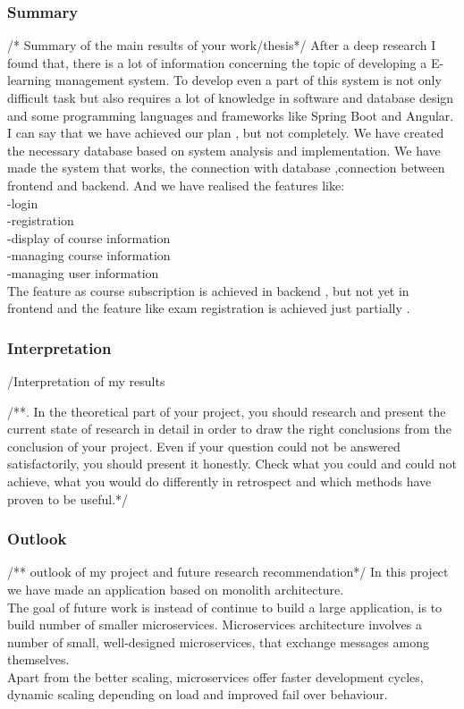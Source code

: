 \documentclass{scrartcl}
\begin{document}
\subsubsection{Summary}
/* Summary of the main results of your work/thesis*/
After a deep research I found that, there is a lot of information concerning the topic of developing a E-learning management system. To develop even a part of this system is not only difficult task but also requires a lot of knowledge in  software and database design and some programming languages and frameworks like Spring Boot and Angular. \\
I can say that we have achieved our plan  , but not completely. We have created the necessary database based on system analysis and implementation. We have made the system that works, the connection with database ,connection between frontend and backend. And we have realised the features like:\\
-login\\
-registration\\
-display of course information\\
-managing course information\\
-managing user information \\
The feature as course subscription is achieved in backend , but not yet in frontend and the feature like exam registration is achieved just partially .\\
 

\subsubsection{Interpretation }
/Interpretation of my results

/**. In the theoretical part of your project, you should research and present the current state of research in detail in order to draw the right conclusions from the conclusion of your project. Even if your question could not be answered satisfactorily, you should present it honestly. Check what you could and could not achieve, what you would do differently in retrospect and which methods have proven to be useful.*/

\subsubsection{Outlook}
/** outlook of my project and future research recommendation*/
In this project we have made an application based on monolith architecture. \\
The goal of future work is  instead of continue to build a large application, is to build number of smaller microservices. Microservices architecture involves a number of small, well-designed microservices, that exchange messages among themselves.\\
Apart from the better scaling, microservices offer faster development cycles, dynamic scaling depending on load and improved fail over behaviour.\\
\end{document}
